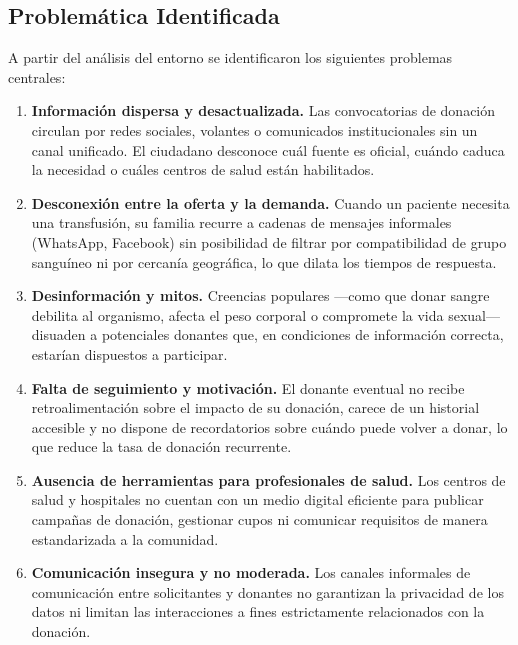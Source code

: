 \documentclass[12pt, a4paper]{article}
\begin{document}
\subsection{Problemática Identificada}

A partir del análisis del entorno se identificaron los siguientes problemas centrales:

\begin{enumerate}[label=\textbf{\arabic*.}, leftmargin=1.5cm]
    \item \textbf{Información dispersa y desactualizada.} Las convocatorias de donación circulan por redes sociales, volantes o comunicados institucionales sin un canal unificado. El ciudadano desconoce cuál fuente es oficial, cuándo caduca la necesidad o cuáles centros de salud están habilitados.

    \item \textbf{Desconexión entre la oferta y la demanda.} Cuando un paciente necesita una transfusión, su familia recurre a cadenas de mensajes informales (WhatsApp, Facebook) sin posibilidad de filtrar por compatibilidad de grupo sanguíneo ni por cercanía geográfica, lo que dilata los tiempos de respuesta.

    \item \textbf{Desinformación y mitos.} Creencias populares ---como que donar sangre debilita al organismo, afecta el peso corporal o compromete la vida sexual--- disuaden a potenciales donantes que, en condiciones de información correcta, estarían dispuestos a participar.

    \item \textbf{Falta de seguimiento y motivación.} El donante eventual no recibe retroalimentación sobre el impacto de su donación, carece de un historial accesible y no dispone de recordatorios sobre cuándo puede volver a donar, lo que reduce la tasa de donación recurrente.

    \item \textbf{Ausencia de herramientas para profesionales de salud.} Los centros de salud y hospitales no cuentan con un medio digital eficiente para publicar campañas de donación, gestionar cupos ni comunicar requisitos de manera estandarizada a la comunidad.

    \item \textbf{Comunicación insegura y no moderada.} Los canales informales de comunicación entre solicitantes y donantes no garantizan la privacidad de los datos ni limitan las interacciones a fines estrictamente relacionados con la donación.
\end{enumerate}
\end{document}
